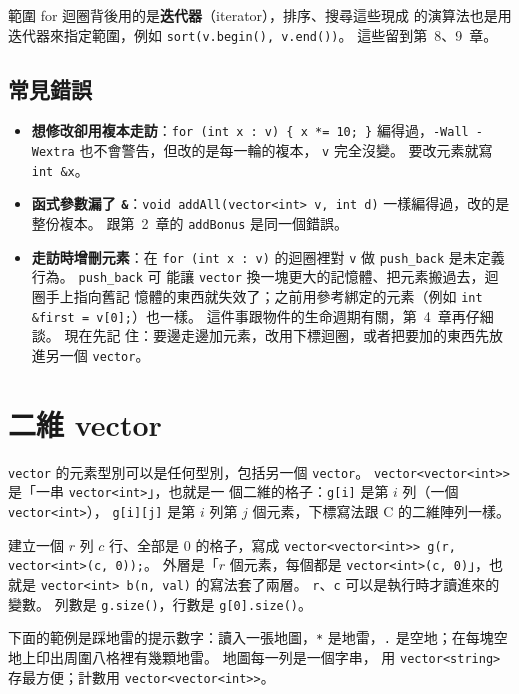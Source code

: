 範圍 for 迴圈背後用的是\textbf{迭代器}（iterator），排序、搜尋這些現成
的演算法也是用迭代器來指定範圍，例如 \texttt{sort(v.begin(), v.end())}。
這些留到第~8、9~章。

\subsection{常見錯誤}

\begin{itemize}
\item \textbf{想修改卻用複本走訪}：\texttt{for (int x : v) \{ x *= 10; \}}
編得過，\texttt{-Wall -Wextra} 也不會警告，但改的是每一輪的複本，
\texttt{v} 完全沒變。 要改元素就寫 \texttt{int \&x}。
\item \textbf{函式參數漏了 \texttt{\&}}：\texttt{void addAll(vector<int>
v, int d)} 一樣編得過，改的是整份複本。 跟第~2~章的 \texttt{addBonus}
是同一個錯誤。
\item \textbf{走訪時增刪元素}：在 \texttt{for (int x : v)} 的迴圈裡對
\texttt{v} 做 \texttt{push\_back} 是未定義行為。 \texttt{push\_back} 可
能讓 \texttt{vector} 換一塊更大的記憶體、把元素搬過去，迴圈手上指向舊記
憶體的東西就失效了；之前用參考綁定的元素（例如 \texttt{int \&first =
v[0];}）也一樣。 這件事跟物件的生命週期有關，第~4~章再仔細談。 現在先記
住：要邊走邊加元素，改用下標迴圈，或者把要加的東西先放進另一個
\texttt{vector}。
\end{itemize}

\section{二維 vector}
\label{sec:vector-2d}

\texttt{vector} 的元素型別可以是任何型別，包括另一個 \texttt{vector}。
\texttt{vector<vector<int>>} 是「一串 \texttt{vector<int>}」，也就是一
個二維的格子：\texttt{g[i]} 是第 $i$ 列（一個 \texttt{vector<int>}），
\texttt{g[i][j]} 是第 $i$ 列第 $j$ 個元素，下標寫法跟 C 的二維陣列一樣。

建立一個 $r$ 列 $c$ 行、全部是 $0$ 的格子，寫成
\texttt{vector<vector<int>> g(r, vector<int>(c, 0));}。 外層是「$r$ 個元素，每個都是 \texttt{vector<int>(c, 0)}」，也就是
\texttt{vector<int> b(n, val)} 的寫法套了兩層。 \texttt{r}、\texttt{c}
可以是執行時才讀進來的變數。 列數是 \texttt{g.size()}，行數是
\texttt{g[0].size()}。

下面的範例是踩地雷的提示數字：讀入一張地圖，\texttt{*} 是地雷，\texttt{.}
是空地；在每塊空地上印出周圍八格裡有幾顆地雷。 地圖每一列是一個字串，
用 \texttt{vector<string>} 存最方便；計數用 \texttt{vector<vector<int>>}。

